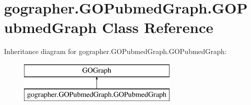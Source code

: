 \hypertarget{classgographer_1_1_g_o_pubmed_graph_1_1_g_o_pubmed_graph}{\section{gographer.\-G\-O\-Pubmed\-Graph.\-G\-O\-Pubmed\-Graph Class Reference}
\label{classgographer_1_1_g_o_pubmed_graph_1_1_g_o_pubmed_graph}
}
Inheritance diagram for gographer.\-G\-O\-Pubmed\-Graph.\-G\-O\-Pubmed\-Graph\-:\begin{figure}[H]
\begin{center}
\leavevmode
\includegraphics[height=2.000000cm]{classgographer_1_1_g_o_pubmed_graph_1_1_g_o_pubmed_graph}
\end{center}
\end{figure}
